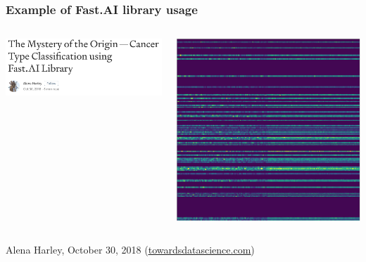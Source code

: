 \documentclass{beamer}
\begin{document}
\begin{frame}
\frametitle{Example of Fast.AI library usage}
\begin{columns}
	\begin{column}{0.6\textwidth}
		\centering
		\includegraphics[width=\textwidth]{images/harley_1.png}
	\end{column}
	\begin{column}{0.4\textwidth}
		\centering
		\includegraphics[width=\textwidth]{images/harley_2.png}
	\end{column}
\end{columns}
\vfill
Alena Harley, October 30, 2018 (\href{https://towardsdatascience.com/the-mystery-of-the-origin-cancer-type-classification-using-fast-ai-libray-212eaf8d3f4e}{{\color{blue}\underline{towardsdatascience.com}}})
\end{frame}
\end{document}

